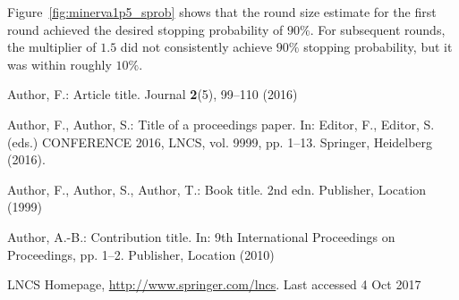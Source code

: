 \documentclass[runningheads]{llncs}
\begin{document}
Figure~\ref{fig:minerva1p5_sprob} shows that the round size estimate for the first round achieved the desired
stopping probability of $90\%$. For subsequent rounds, the multiplier of $1.5$ did not consistently achieve $90\%$ stopping
probability, but it was within  roughly $10\%$. 







%
%
%
% 
% 
%
\begin{thebibliography}{8}
Author, F.: Article title. Journal \textbf{2}(5), 99--110 (2016)

Author, F., Author, S.: Title of a proceedings paper. In: Editor,
F., Editor, S. (eds.) CONFERENCE 2016, LNCS, vol. 9999, pp. 1--13.
Springer, Heidelberg (2016). 

Author, F., Author, S., Author, T.: Book title. 2nd edn. Publisher,
Location (1999)

Author, A.-B.: Contribution title. In: 9th International Proceedings
on Proceedings, pp. 1--2. Publisher, Location (2010)

LNCS Homepage, \url{http://www.springer.com/lncs}. Last accessed 4
Oct 2017
\end{thebibliography}
\end{document}
